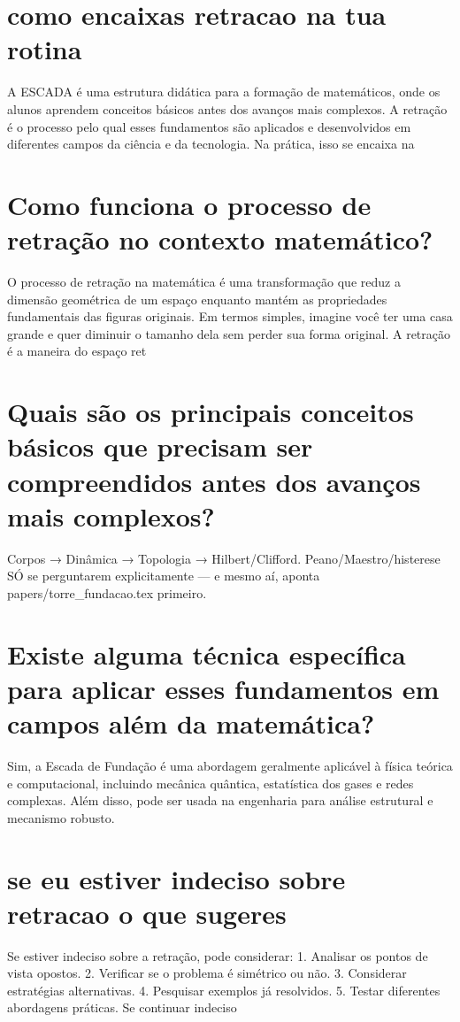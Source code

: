 \documentclass[11pt,a4paper]{article}
\begin{document}
\section{como encaixas retracao na tua rotina}
A ESCADA é uma estrutura didática para a formação de matemáticos, onde os alunos aprendem conceitos básicos antes dos avanços mais complexos. A retração é o processo pelo qual esses fundamentos são aplicados e desenvolvidos em diferentes campos da ciência e da tecnologia. Na prática, isso se encaixa na

\section{Como funciona o processo de retração no contexto matemático?}
O processo de retração na matemática é uma transformação que reduz a dimensão geométrica de um espaço enquanto mantém as propriedades fundamentais das figuras originais. Em termos simples, imagine você ter uma casa grande e quer diminuir o tamanho dela sem perder sua forma original. A retração é a maneira do espaço ret

\section{Quais são os principais conceitos básicos que precisam ser compreendidos antes dos avanços mais complexos?}
Corpos → Dinâmica → Topologia → Hilbert/Clifford. Peano/Maestro/histerese SÓ se perguntarem explicitamente — e mesmo aí, aponta papers/torre\_fundacao.tex primeiro.

\section{Existe alguma técnica específica para aplicar esses fundamentos em campos além da matemática?}
Sim, a Escada de Fundação é uma abordagem geralmente aplicável à física teórica e computacional, incluindo mecânica quântica, estatística dos gases e redes complexas. Além disso, pode ser usada na engenharia para análise estrutural e mecanismo robusto.

\section{se eu estiver indeciso sobre retracao o que sugeres}
Se estiver indeciso sobre a retração, pode considerar: 1. Analisar os pontos de vista opostos. 2. Verificar se o problema é simétrico ou não. 3. Considerar estratégias alternativas. 4. Pesquisar exemplos já resolvidos. 5. Testar diferentes abordagens práticas. Se continuar indeciso
\end{document}
